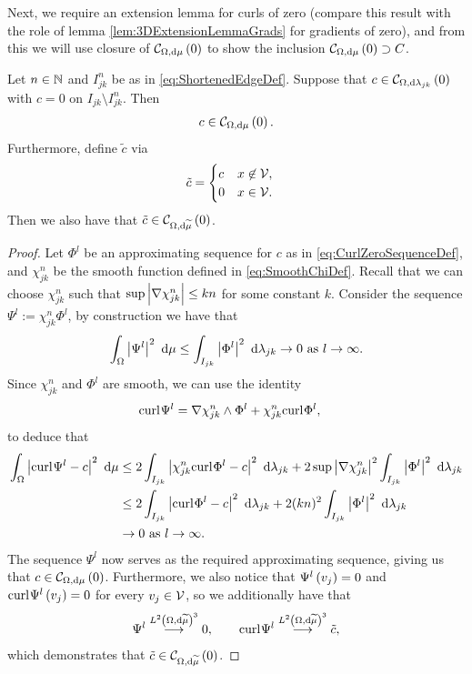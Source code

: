 Next, we require an extension lemma for curls of zero (compare this result with the role of lemma \ref{lem:3DExtensionLemmaGrads} for gradients of zero), and from this we will use closure of $\mathcal{C}_{ \Omega, \mathrm{d}\mu}\left( 0 \right)$ to show the inclusion $\mathcal{C}_{ \Omega, \mathrm{d}\mu}\left( 0 \right)\supset C$.
\begin{lemma} \label{lem:CurlZeroExtensionLemma}
	Let $n\in\mathbb{N}$ and $I_{jk}^n$ be as in \eqref{eq:ShortenedEdgeDef}.
	Suppose that $c\in\mathcal{C}_{ \Omega, \mathrm{d}\lambda_{jk}}\left( 0 \right)$ with $c=0$ on $I_{jk}\setminus I_{jk}^n$.
	Then
	\begin{align*}
		c\in\mathcal{C}_{ \Omega, \mathrm{d}\mu}\left( 0 \right).
	\end{align*}
	Furthermore, define $\tilde{c}$ via
	\begin{align*}
		\tilde{c} &= \begin{cases} c & x\not\in\mathcal{V}, \\ 0 & x\in\mathcal{V}. \end{cases}
	\end{align*}
	Then we also have that $\tilde{c}\in\mathcal{C}_{ \Omega, \mathrm{d}\widetilde{\mu}}\left( 0 \right)$.
\end{lemma}
\begin{proof}
	Let $\Phi^l$ be an approximating sequence for $c$ as in \eqref{eq:CurlZeroSequenceDef}, and $\chi_{jk}^n$ be the smooth function defined in \eqref{eq:SmoothChiDef}.
	Recall that we can choose $\chi_{jk}^n$ such that $\sup\left\lvert \nabla\chi_{jk}^n \right\rvert\leq kn$ for some constant $k$.
	Consider the sequence $\Psi^l := \chi_{jk}^n \Phi^l$, by construction we have that
	\begin{align*}
		\int_{\Omega} \left\lvert \Psi^l \right\rvert^2  \ \mathrm{d}\mu \leq \int_{I_{jk}} \left\lvert \Phi^l \right\rvert^2  \ \mathrm{d}\lambda_{jk} \rightarrow 0 \ \text{as} \ l \rightarrow\infty.
	\end{align*}
	Since $\chi_{jk}^n$ and $\Phi^l$ are smooth, we can use the identity
	\begin{align*}
		\mathrm{curl}_{}\Psi^l &= \nabla\chi_{jk}^n\wedge\Phi^l + \chi_{jk}^n\mathrm{curl}_{}\Phi^l,
	\end{align*}
	to deduce that
	\begin{align*}
		\int_{\Omega} \left\lvert  \mathrm{curl}_{}\Psi^l - c  \right\rvert^2  \ \mathrm{d}\mu
		&\leq 2\int_{I_{jk}} \left\lvert  \chi_{jk}^n\mathrm{curl}_{}\Phi^l - c  \right\rvert^2  \ \mathrm{d}\lambda_{jk}
		+ 2\sup\left\lvert \nabla\chi_{jk}^n \right\rvert^2 \int_{I_{jk}} \left\lvert  \Phi^l  \right\rvert^2  \ \mathrm{d}\lambda_{jk} \\
		&\leq2\int_{I_{jk}} \left\lvert  \mathrm{curl}_{}\Phi^l - c  \right\rvert^2  \ \mathrm{d}\lambda_{jk}
		+ 2(kn)^2 \int_{I_{jk}} \left\lvert  \Phi^l  \right\rvert^2  \ \mathrm{d}\lambda_{jk} \\
		&\rightarrow 0 \ \text{as} \ l \rightarrow\infty.
	\end{align*}
	The sequence $\Psi^l$ now serves as the required approximating sequence, giving us that $c\in\mathcal{C}_{ \Omega, \mathrm{d}\mu}\left( 0 \right)$.
	Furthermore, we also notice that $\Psi^l\left( v_j \right)=0$ and $\mathrm{curl}_{}\Psi^l\left( v_j \right)=0$ for every $v_j\in\mathcal{V}$, so we additionally have that
	\begin{align*}
		\Psi^l \overset{L^{2}\left( \Omega,\mathrm{d} \widetilde{\mu} \right)^3}{\longrightarrow} 0, 
		\qquad
		\mathrm{curl}_{}\Psi^l \overset{L^{2}\left( \Omega,\mathrm{d} \widetilde{\mu} \right)^3}{\longrightarrow} \tilde{c},
	\end{align*}
	which demonstrates that $\tilde{c}\in\mathcal{C}_{ \Omega, \mathrm{d}\widetilde{\mu}}\left( 0 \right)$.
\end{proof}

